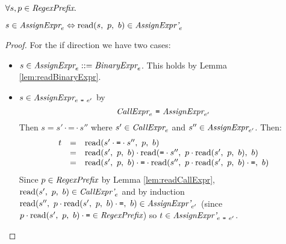 \documentclass[preprint,10pt]{sigplanconf}
\begin{document}
\begin{lemma}\mbox{}
  
  \( \forall s, p \in \textit{RegexPrefix}. \)

  \( s \in \textit{AssignExpr}_{e} \Leftrightarrow 
  \textrm{read}(s,~p,~b) \in \textit{AssignExpr'}_{e} \)
\end{lemma}
\begin{proof}
  For the if direction we have two cases:
  \begin{itemize}
  \item \( s \in \textit{AssignExpr}_{e} ::=
    \textit{BinaryExpr}_{e} \). This holds by Lemma
    \ref{lem:readBinaryExpr}.
    
  \item \( s \in \textit{AssignExpr}_{e~\texttt{=}~e'} \) by
    \[ 
    \textit{CallExpr}_{e} ~\texttt{=}~
    \textit{AssignExpr}_{e'} 
    \]
    Then \( s = s' \cdot \texttt{=} \cdot s'' \) where \( s' \in
    \textit{CallExpr}_{e} \) and \( s'' \in
    \textit{AssignExpr}_{e'} \). Then:
    \[
    \begin{array}{rcl}
      t &=& \textrm{read}(s' \cdot \texttt{=} \cdot s'',~p,~b)
      \\
      &=& \textrm{read}(s',~p,~b)
      \cdot \textrm{read}(\texttt{=}\cdot s'',~p \cdot \textrm{read}(s',~p,~b),~b)
      \\
      &=& \textrm{read}(s',~p,~b) \cdot \texttt{=} \cdot
      \textrm{read}(s'',~p \cdot \textrm{read}(s',~p,~b) \cdot \texttt{=},~b)
    \end{array}
    \]
    Since \( p \in \textit{RegexPrefix} \) by Lemma
    \ref{lem:readCallExpr}, \( \textrm{read}(s',~p,~b) \in
    \textit{CallExpr'}_{e} \) and by induction \( \textrm{read}(s'',~p
      \cdot \textrm{read}(s',~p,~b) \cdot \texttt{=},~b) \in
    \textit{AssignExpr'}_{e'} \) 
    (since \( p \cdot \textrm{read}(s',~p,~b) \cdot \texttt{=} \in \textit{RegexPrefix} \)) so \( t \in
    \textit{AssignExpr'}_{e~\texttt{=}~e'} \).
  \end{itemize}
\end{proof}
\end{document}
